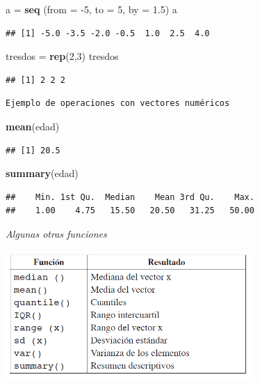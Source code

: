 \documentclass[]{article}
\newenvironment{Shaded}{\begin{snugshade}}{\end{snugshade}}
\newcommand{\DataTypeTok}[1]{\textcolor[rgb]{0.13,0.29,0.53}{#1}}
\newcommand{\DecValTok}[1]{\textcolor[rgb]{0.00,0.00,0.81}{#1}}
\newcommand{\FloatTok}[1]{\textcolor[rgb]{0.00,0.00,0.81}{#1}}
\newcommand{\KeywordTok}[1]{\textcolor[rgb]{0.13,0.29,0.53}{\textbf{#1}}}
\newcommand{\NormalTok}[1]{#1}
\newcommand{\StringTok}[1]{\textcolor[rgb]{0.31,0.60,0.02}{#1}}
\begin{document}
\begin{Shaded}
\begin{Highlighting}[]
\NormalTok{a =}\StringTok{ }\KeywordTok{seq}\NormalTok{ (}\DataTypeTok{from =} \DecValTok{-5}\NormalTok{, }\DataTypeTok{to =} \DecValTok{5}\NormalTok{, }\DataTypeTok{by =} \FloatTok{1.5}\NormalTok{)}
\NormalTok{a}
\end{Highlighting}
\end{Shaded}

\begin{verbatim}
## [1] -5.0 -3.5 -2.0 -0.5  1.0  2.5  4.0
\end{verbatim}

\begin{Shaded}
\begin{Highlighting}[]
\NormalTok{tresdos =}\StringTok{ }\KeywordTok{rep}\NormalTok{(}\DecValTok{2}\NormalTok{,}\DecValTok{3}\NormalTok{)}
\NormalTok{tresdos}
\end{Highlighting}
\end{Shaded}

\begin{verbatim}
## [1] 2 2 2
\end{verbatim}

\begin{verbatim}
Ejemplo de operaciones con vectores numéricos
\end{verbatim}

\begin{Shaded}
\begin{Highlighting}[]
\KeywordTok{mean}\NormalTok{(edad)}
\end{Highlighting}
\end{Shaded}

\begin{verbatim}
## [1] 20.5
\end{verbatim}

\begin{Shaded}
\begin{Highlighting}[]
\KeywordTok{summary}\NormalTok{(edad)}
\end{Highlighting}
\end{Shaded}

\begin{verbatim}
##    Min. 1st Qu.  Median    Mean 3rd Qu.    Max. 
##    1.00    4.75   15.50   20.50   31.25   50.00
\end{verbatim}

\emph{Algunas otras funciones}

\includegraphics[width=0.7\textwidth,height=\textheight]{vectorfunc.jpg}
\end{document}
